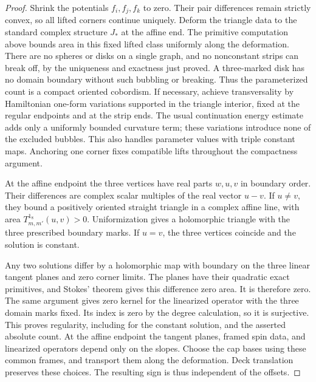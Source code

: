 \begin{proof}
Shrink the potentials $f_i,f_j,f_k$ to zero.  Their pair differences remain
strictly convex, so all lifted corners continue uniquely.  Deform the
triangle data to the standard complex structure $J_*$ at the affine end.
The primitive computation above bounds area in this fixed lifted class
uniformly along the deformation.  There are no spheres or disks on a
single graph, and no nonconstant strips can break off, by the uniqueness
and exactness just proved.  A three-marked disk has no domain boundary
without such bubbling or breaking.  Thus the parameterized count is a
compact oriented cobordism.  If necessary, achieve transversality by
Hamiltonian one-form variations supported in the triangle interior,
fixed at the regular endpoints and at the strip ends.  The usual
continuation energy estimate adds only a uniformly bounded curvature
term; these variations introduce none of the excluded bubbles.  This
also handles parameter values with triple constant maps.  Anchoring one
corner fixes compatible lifts throughout the compactness argument.

At the affine endpoint the three vertices have real parts $w,u,v$ in
boundary order.  Their differences are complex scalar multiples of the
real vector $u-v$.  If $u\neq v$, they bound a positively oriented straight
triangle in a complex affine line, with area
$T^{1_8}_{m,m'}(u,v)>0$.  Uniformization gives a holomorphic triangle with
the three prescribed boundary marks.  If $u=v$, the three vertices
coincide and the solution is constant.

Any two solutions differ by a holomorphic map with boundary on the three
linear tangent planes and zero corner limits.  The planes have their
quadratic exact primitives, and Stokes' theorem gives this difference
zero area.  It is therefore zero.  The same argument gives zero kernel
for the linearized operator with the three domain marks fixed.  Its
index is zero by the degree calculation, so it is surjective.  This
proves regularity, including for the constant solution, and the asserted
absolute count.  At the affine endpoint the tangent planes, framed spin
data, and linearized operators depend only on the slopes.  Choose the cap
bases using these common frames, and transport them along the deformation.
Deck translation preserves these choices.  The resulting sign is thus
independent of the offsets.
\end{proof}

